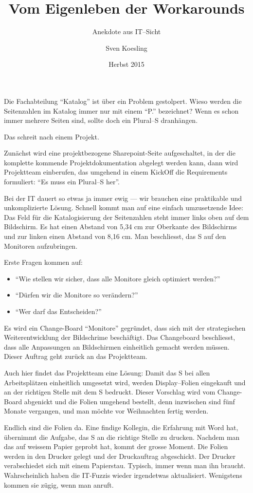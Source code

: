\documentclass[german,headsepline]{scrartcl}
\title{Vom Eigenleben der Workarounds}
\subtitle{Anekdote aus IT--Sicht}
\author{Sven Koesling}
\date{Herbst 2015}
\begin{document}
\maketitle

Die Fachabteilung ``Katalog'' ist über ein Problem gestolpert. Wieso werden die Seitenzahlen im Katalog immer nur mit einem ``P.'' bezeichnet? Wenn es schon immer mehrere Seiten sind, sollte doch ein Plural--S dranhängen.

Das schreit nach einem Projekt. 

Zunächst wird eine projektbezogene Sharepoint-Seite aufgeschaltet, in der die komplette kommende Projektdokumentation abgelegt werden kann, dann wird Projektteam einberufen, das umgehend in einem KickOff die Requirements formuliert: ``Es muss ein Plural--S her''.

Bei der IT dauert so etwas ja immer ewig --- wir brauchen eine praktikable und unkomplizierte Lösung. Schnell kommt man auf eine einfach umzusetzende Idee: Das Feld für die Katalogisierung der Seitenzahlen steht immer links oben auf dem Bildschirm. Es hat einen Abstand von 5,34 cm zur Oberkante des Bildschirms und zur linken einen Abstand von 8,16 cm. Man beschliesst, das S auf den Monitoren aufzubringen. 

Erste Fragen kommen auf:

\begin{itemize}
  \item ``Wie stellen wir sicher, dass alle Monitore gleich optimiert werden?''
  \item ``Dürfen wir die Monitore so verändern?''
  \item ``Wer darf das Entscheiden?''
\end{itemize}

Es wird ein Change-Board ``Monitore'' gegründet, dass sich mit der strategischen Weiterentwicklung der Bildschrime beschäftigt. Das Changeboard beschliesst, dass alle Anpassungen an Bildschirmen einheitlich gemacht werden müssen. Dieser Auftrag geht zurück an das Projektteam. 

Auch hier findet das Projektteam eine Lösung: Damit das S bei allen Arbeitsplätzen einheitlich umgesetzt wird, werden Display--Folien eingekauft und an der richtigen Stelle mit dem S bedruckt. Dieser Vorschlag wird vom Change-Board abgenickt und die Folien umgehend bestellt, denn inzwischen sind fünf Monate vergangen, und man möchte vor Weihnachten fertig werden.

Endlich sind die Folien da. Eine findige Kollegin, die Erfahrung mit Word hat, übernimmt die Aufgabe, das S an die richtige Stelle zu drucken. Nachdem man das auf weissem Papier geprobt hat, kommt der grosse Moment. Die Folien werden in den Drucker gelegt und der Druckauftrag abgeschickt. Der Drucker verabschiedet sich mit einem Papierstau. Typisch, immer wenn man ihn braucht. Wahrscheinlich haben die IT-Fuzzis wieder irgendetwas aktualisiert. Wenigstens kommen sie zügig, wenn man anruft. 
\end{document}
